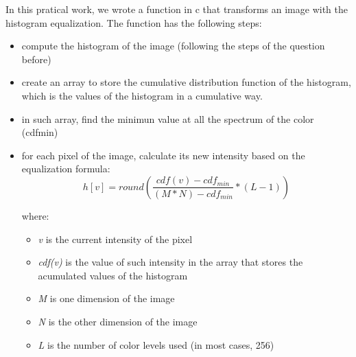 \documentclass{report}
\begin{document}
	In this pratical work, we wrote a function in c that transforms an image with the histogram equalization. The function has the following steps:
	\begin{itemize}
  		\item compute the histogram of the image (following the steps of the question before)
  		\item create an array to store the cumulative distribution function of the histogram, which is the values of the histogram in a cumulative way.
  		\item in such array, find the minimun value at all the spectrum of the color (cdfmin)
  		\item for each pixel of the image, calculate its new intensity based on the equalization formula:
			\begin{equation}
				h[v]= round \left( \frac{cdf(v)-cdf_{min}}{(M * N) - cdf_{min}} * (L-1) \right) 
			\label{eq:equalization}
			\end{equation}
			
			where:		
			\begin{itemize}
	  			\item {\it v} is the current intensity of the pixel		
		  		\item {\it cdf(v)} is the value of such intensity in the array that stores the acumulated values of the histogram
		  		\item {\it M} is one dimension of the image		
		  		\item {\it N} is the other dimension of the image
		  		\item {\it L} is the number of color levels used (in most cases, 256)
			\end{itemize}
	\end{itemize}
\end{document}
